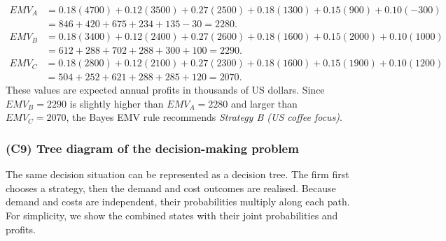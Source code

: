 \documentclass[11pt]{article}
\begin{document}
	\[
	\begin{aligned}
		EMV_A &= 0.18(4700)+0.12(3500)+0.27(2500)+0.18(1300)+0.15(900)+0.10(-300)\\
		&= 846+420+675+234+135-30=2280.
	\end{aligned}
	\]
	\[
	\begin{aligned}
		EMV_B &= 0.18(3400)+0.12(2400)+0.27(2600)+0.18(1600)+0.15(2000)+0.10(1000)\\
		&= 612+288+702+288+300+100=2290.
	\end{aligned}
	\]
	\[
	\begin{aligned}
		EMV_C &= 0.18(2800)+0.12(2100)+0.27(2300)+0.18(1600)+0.15(1900)+0.10(1200)\\
		&= 504+252+621+288+285+120=2070.
	\end{aligned}
	\]
	These values are expected annual profits in thousands of US dollars. Since \(EMV_B=2290\) is slightly higher than \(EMV_A=2280\) and larger than \(EMV_C=2070\), the Bayes EMV rule recommends \emph{Strategy B (US coffee focus)}.
	
	\subsubsection{(C9) Tree diagram of the decision-making problem}\label{subsubsec:example2-c9}
	
	The same decision situation can be represented as a decision tree. The firm first chooses a strategy, then the
	demand and cost outcomes are realised. Because demand and costs are independent, their probabilities multiply along
	each path. For simplicity, we show the combined states with their joint probabilities and profits.
	
\end{document}
